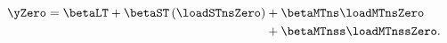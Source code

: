 \begin{equation} \label{eq:nNSSzero}
	\begin{split}
		\yZero = \betaLT + \betaST \left(\loadSTnsZero\right) 
		& + \betaMTns \loadMTnsZero \\
		& + \betaMTnss \loadMTnssZero.
	\end{split}
\end{equation}